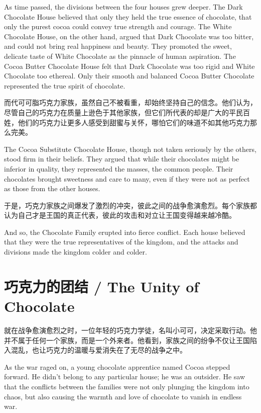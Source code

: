 \begin{flushright} As time passed, the divisions between the four houses grew deeper. The Dark Chocolate House believed that only they held the true essence of chocolate, that only the purest cocoa could convey true strength and courage. The White Chocolate House, on the other hand, argued that Dark Chocolate was too bitter, and could not bring real happiness and beauty. They promoted the sweet, delicate taste of White Chocolate as the pinnacle of human aspiration. The Cocoa Butter Chocolate House felt that Dark Chocolate was too rigid and White Chocolate too ethereal. Only their smooth and balanced Cocoa Butter Chocolate represented the true spirit of chocolate. \end{flushright}

而代可可脂巧克力家族，虽然自己不被看重，却始终坚持自己的信念。他们认为，尽管自己的巧克力在质量上逊色于其他家族，但它们所代表的却是广大的平民百姓，他们的巧克力让更多人感受到甜蜜与关怀，哪怕它们的味道不如其他巧克力那么完美。

\begin{flushright} The Cocoa Substitute Chocolate House, though not taken seriously by the others, stood firm in their beliefs. They argued that while their chocolates might be inferior in quality, they represented the masses, the common people. Their chocolates brought sweetness and care to many, even if they were not as perfect as those from the other houses. \end{flushright}

于是，巧克力家族之间爆发了激烈的冲突，彼此之间的战争愈演愈烈。每个家族都认为自己才是王国的真正代表，彼此的攻击和对立让王国变得越来越冷酷。

\begin{flushright} And so, the Chocolate Family erupted into fierce conflict. Each house believed that they were the true representatives of the kingdom, and the attacks and divisions made the kingdom colder and colder. \end{flushright}

\section*{巧克力的团结 / The Unity of Chocolate}
就在战争愈演愈烈之时，一位年轻的巧克力学徒，名叫小可可，决定采取行动。他并不属于任何一个家族，而是一个外来者。他看到，家族之间的纷争不仅让王国陷入混乱，也让巧克力的温暖与爱消失在了无尽的战争之中。

\begin{flushright} As the war raged on, a young chocolate apprentice named Cocoa stepped forward. He didn’t belong to any particular house; he was an outsider. He saw that the conflicts between the families were not only plunging the kingdom into chaos, but also causing the warmth and love of chocolate to vanish in endless war. \end{flushright}


